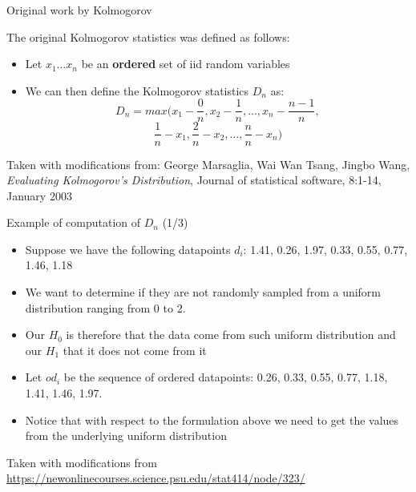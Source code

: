 \documentclass{beamer}
\begin{document}
\begin{frame}
{\centerline{Original work by Kolmogorov}}

The original Kolmogorov statistics was defined as follows:
\begin{itemize}
    \item Let $x_1 \ldots x_n$ be an \textbf{ordered} set of iid random variables
    \item We can then define the Kolmogorov statistics $D_{n}$ as:
    $$D_{n} = max(x_1 - \frac{0}{n}, x_2 - \frac{1}{n}, \ldots, x_n - \frac{n-1}{n}, $$
    $$ \frac{1}{n} - x_1, \frac{2}{n} - x_2, \ldots, \frac{n}{n} - x_n )$$

\end{itemize}


\begin{center}
\tiny{Taken with modifications from: George Marsaglia, Wai Wan Tsang, Jingbo Wang, \textit{Evaluating Kolmogorov’s Distribution}, Journal of statistical software, 8:1-14, January 2003}
\end{center}

\end{frame}


\begin{frame}
{\centerline{Example of computation of $D_n$ (1/3)}}

\begin{itemize}
   \item Suppose we have the following datapoints $d_i$: 1.41, 0.26, 1.97, 0.33, 0.55, 0.77, 1.46, 1.18
   \item We want to determine if they are not randomly sampled from a uniform distribution ranging from 0 to 2.
   \item Our $H_0$ is therefore that the data come from such uniform distribution and our $H_1$ that it does not come from it
   \item Let $od_i$ be the sequence of ordered datapoints: 0.26, 0.33, 0.55, 0.77, 1.18, 1.41, 1.46, 1.97.
   \item Notice that with respect to the formulation above we need to get the values from the underlying uniform distribution
\end{itemize}

\begin{center}
\tiny{Taken with modifications from \url{https://newonlinecourses.science.psu.edu/stat414/node/323/}}
\end{center}
\end{frame}
\end{document}

